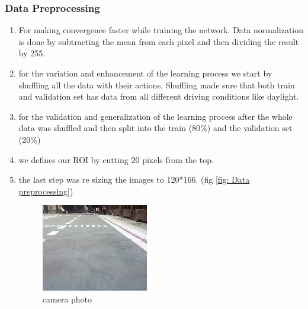 \subsubsection{Data Preprocessing}
\begin{enumerate}
    \item For making convergence faster while training the network. Data normalization is done by subtracting the mean from each pixel and then dividing the result by 255.
    \item for the variation and enhancement of the  learning process we start by shuffling all the data with their actions, Shuffling made sure that both train and validation set has data from all different driving conditions like daylight.
    \item for the validation and generalization of the  learning process after the  whole data was shuffled and then split into the train (80\%) and the validation set (20\%)
    \item we defines our ROI by cutting 20 pixels from the top.
    \item the last step was re sizing the images to 120*166.
    (fig \ref{fig: Data preprocessing})
    \begin{figure}%
    \begin{minipage}[t]{0.3\linewidth}
	\includegraphics[width=\textwidth]{images/Learningprocess/img3.png}
	\caption[camera photo]{ \left  \newline camera photo}
     \end{minipage}
	\begin{minipage}[t]{0.3\linewidth}

\end{minipage}
\end{figure}
\end{enumerate}
